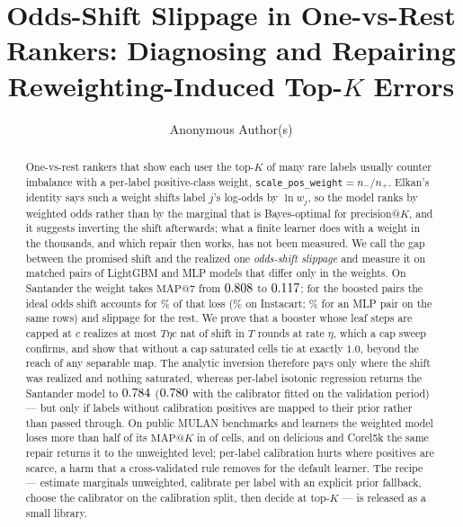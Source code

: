 \documentclass[runningheads]{llncs}
\makeatletter
\newcommand{\mapk}{\mathrm{MAP}@K\xspace}
\newcommand{\mapseven}{\mathrm{MAP}@7\xspace}
\makeatother
\begin{document}
\title{Odds-Shift Slippage in One-vs-Rest Rankers: Diagnosing and Repairing Reweighting-Induced Top-$K$ Errors}
\author{Anonymous Author(s)}
\maketitle

\begin{abstract}
One-vs-rest rankers that show each user the top-$K$ of many rare labels usually counter imbalance with a per-label positive-class weight, \texttt{scale\_pos\_weight}$=n_-/n_+$. Elkan's identity says such a weight shifts label $j$'s log-odds by $\ln w_j$, so the model ranks by weighted odds rather than by the marginal that is Bayes-optimal for precision@$K$, and it suggests inverting the shift afterwards; what a finite learner does with a weight in the thousands, and which repair then works, has not been measured. We call the gap between the promised shift and the realized one \emph{odds-shift slippage} and measure it on matched pairs of LightGBM and MLP models that differ only in the weights. On Santander the weight takes $\mapseven$ from $0.808$ to $0.117$; for the boosted pairs the ideal odds shift accounts for \noddsShare\% of that loss (\nIoddsShare\% on Instacart; \nModdsShare\% for an MLP pair on the same rows) and slippage for the rest. We prove that a booster whose leaf steps are capped at $c$ realizes at most $T\eta c$ nat of shift in $T$ rounds at rate $\eta$, which a cap sweep confirms, and show that without a cap saturated cells tie at exactly $1.0$, beyond the reach of any separable map. The analytic inversion therefore pays only where the shift was realized and nothing saturated, whereas per-label isotonic regression returns the Santander model to $0.784$ ($0.780$ with the calibrator fitted on the validation period) --- but only if labels without calibration positives are mapped to their prior rather than passed through. On \nnMulan{} public MULAN benchmarks and \nnLearners{} learners the weighted model loses more than half of its $\mapk$ in \nnCollapseCells{} of \nnDoseCells{} cells, and on delicious and Corel5k the same repair returns it to the unweighted level; per-label calibration hurts where positives are scarce, a harm that a cross-validated rule removes for the default learner. The recipe --- estimate marginals unweighted, calibrate per label with an explicit prior fallback, choose the calibrator on the calibration split, then decide at top-$K$ --- is released as a small library.
\end{abstract}
\end{document}
